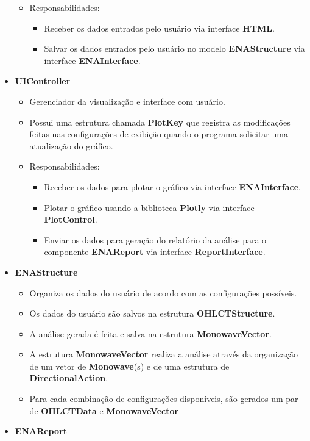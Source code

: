 \documentclass[12pt]{article}
\begin{document}
\begin{itemize}
\begin{itemize}
		\item Responsabilidades:
		\begin{itemize}
			\item Receber os dados entrados pelo usuário via interface \textbf{HTML}.
			\item Salvar os dados entrados pelo usuário no modelo \textbf{ENAStructure} via interface \textbf{ENAInterface}.
		\end{itemize}
	\end{itemize}
	\item \textbf{UIController}
	\begin{itemize}
		\item Gerenciador da visualização e interface com usuário.
		\item Possui uma estrutura chamada \textbf{PlotKey} que registra as modificações feitas nas configurações de exibição quando o programa solicitar uma atualização do gráfico.
		\item Responsabilidades:
		\begin{itemize}
			\item Receber os dados para plotar o gráfico via interface \textbf{ENAInterface}.
			\item Plotar o gráfico usando a biblioteca \textbf{Plotly} via interface \textbf{PlotControl}.
			\item Enviar os dados para geração do relatório da análise para o componente \textbf{ENAReport} via interface \textbf{ReportInterface}.
		\end{itemize}
	\end{itemize}
	\item \textbf{ENAStructure}
	\begin{itemize}
		\item Organiza os dados do usuário de acordo com as configurações possíveis.
		\item Os dados do usuário são salvos na estrutura \textbf{OHLCTStructure}.
		\item A análise gerada é feita e salva na estrutura \textbf{MonowaveVector}.
		\item A estrutura \textbf{MonowaveVector} realiza a análise através da organização de um vetor de \textbf{Monowave}(s) e de uma estrutura de \textbf{DirectionalAction}.
		\item Para cada combinação de configurações disponíveis, são gerados um par de \textbf{OHLCTData} e \textbf{MonowaveVector}
	\end{itemize}
	\item \textbf{ENAReport}

\end{itemize}
\end{document}
